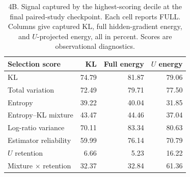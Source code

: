 \begin{table}[!htbp]
\centering
\caption{4B. Signal captured by the highest-scoring decile at the final paired-study checkpoint. Each cell reports FULL. Columns give captured KL, full hidden-gradient energy, and $U$-projected energy, all in percent. Scores are observational diagnostics.}
\label{tab:paired4b_selectors}
\small
\setlength{\tabcolsep}{3pt}
\begin{tabular}{lrrr}
\toprule
Selection score & KL & Full energy & $U$ energy \\
\midrule
KL & 74.79 & 81.87 & 79.06 \\
Total variation & 72.49 & 79.71 & 77.50 \\
Entropy & 39.22 & 40.04 & 31.85 \\
Entropy--KL mixture & 43.47 & 44.46 & 37.04 \\
Log-ratio variance & 70.11 & 83.34 & 80.63 \\
Estimator reliability & 59.99 & 76.14 & 70.79 \\
$U$ retention & 6.66 & 5.23 & 16.22 \\
Mixture $\times$ retention & 32.37 & 32.84 & 61.36 \\
\bottomrule
\end{tabular}
\end{table}
